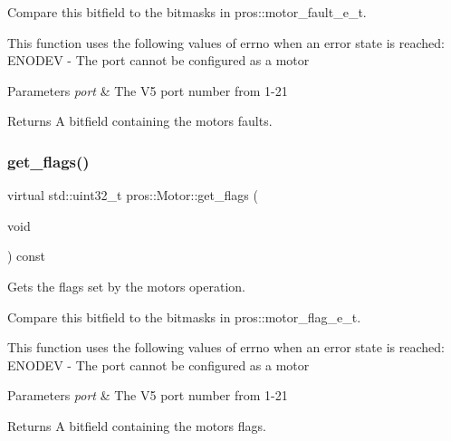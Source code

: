 Compare this bitfield to the bitmasks in pros\+::motor\+\_\+fault\+\_\+e\+\_\+t.

This function uses the following values of errno when an error state is reached\+: E\+N\+O\+D\+EV -\/ The port cannot be configured as a motor


\begin{DoxyParams}{Parameters}
{\em port} & The V5 port number from 1-\/21\\
\hline
\end{DoxyParams}
\begin{DoxyReturn}{Returns}
A bitfield containing the motor\textquotesingle{}s faults. 
\end{DoxyReturn}
\mbox{\label{classpros_1_1Motor_a7e24aa1c4363a131829e902f12e7364c}} 
\subsubsection{\texorpdfstring{get\+\_\+flags()}{get\_flags()}}
{\footnotesize\ttfamily virtual std\+::uint32\+\_\+t pros\+::\+Motor\+::get\+\_\+flags (\begin{DoxyParamCaption}\item[{void}]{ }\end{DoxyParamCaption}) const\hspace{0.3cm}{\ttfamily [virtual]}}



Gets the flags set by the motor\textquotesingle{}s operation. 

Compare this bitfield to the bitmasks in pros\+::motor\+\_\+flag\+\_\+e\+\_\+t.

This function uses the following values of errno when an error state is reached\+: E\+N\+O\+D\+EV -\/ The port cannot be configured as a motor


\begin{DoxyParams}{Parameters}
{\em port} & The V5 port number from 1-\/21\\
\hline
\end{DoxyParams}
\begin{DoxyReturn}{Returns}
A bitfield containing the motor\textquotesingle{}s flags. 
\end{DoxyReturn}
\mbox{\label{classpros_1_1Motor_ae82c57d590e18d7d90afec1e9cc3bb4e}} 
